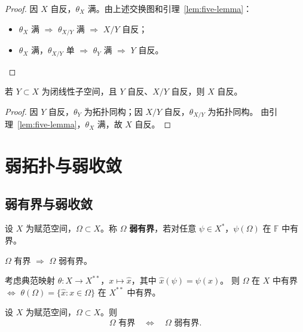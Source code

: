 \documentclass[lang=cn,a4paper,newtx,section]{elegantbook}
\begin{document}
\begin{proof}
  因 $X$ 自反，$\theta_X$ 满。由上述交换图和引理~\ref{lem:five-lemma}：
  \begin{itemize}
    \item $\theta_X$ 满 $\Rightarrow$ $\theta_{X/Y}$ 满 $\Rightarrow$ $X/Y$ 自反；
    \item $\theta_X$ 满，$\theta_{X/Y}$ 单 $\Rightarrow$ $\theta_Y$ 满 $\Rightarrow$ $Y$ 自反。
  \end{itemize}
\end{proof}

\begin{theorem}
  若 $Y\subset X$ 为闭线性子空间，且 $Y$ 自反、$X/Y$ 自反，则 $X$ 自反。
\end{theorem}

\begin{proof}
  因 $Y$ 自反，$\theta_Y$ 为拓扑同构；因 $X/Y$ 自反，$\theta_{X/Y}$ 为拓扑同构。
  由引理~\ref{lem:five-lemma}，$\theta_X$ 满，故 $X$ 自反。
\end{proof}

\chapter{弱拓扑与弱收敛}

\section{弱有界与弱收敛}

\begin{definition}[弱有界]
  设 $X$ 为赋范空间，$\Omega\subset X$。称 $\Omega$ \textbf{弱有界}，若对任意 $\psi\in X^*$，$\psi(\Omega)$ 在 $\mathbb{F}$ 中有界。
\end{definition}

\begin{proposition}
  $\Omega$ 有界 $\Rightarrow$ $\Omega$ 弱有界。
\end{proposition}

\begin{remark}
  考虑典范映射 $\theta:X\to X^{**}$，$x\mapsto\hat{x}$，其中 $\hat{x}(\psi)=\psi(x)$。
  则 $\Omega$ 在 $X$ 中有界 $\Longleftrightarrow$ $\theta(\Omega)=\{\hat{x}:x\in\Omega\}$ 在 $X^{**}$ 中有界。
\end{remark}

\begin{theorem}
  设 $X$ 为赋范空间，$\Omega\subset X$。则
  \[
    \Omega\text{ 有界}\quad\Longleftrightarrow\quad\Omega\text{ 弱有界}.
  \]
\end{theorem}
\end{document}
